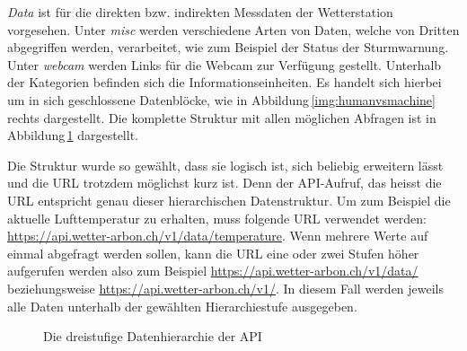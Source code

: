 \noindent
\emph{Data} ist für die direkten bzw. indirekten Messdaten der Wetterstation vorgesehen. Unter \emph{misc} werden verschiedene Arten von Daten, welche von Dritten abgegriffen werden, verarbeitet, wie zum Beispiel der Status der Sturmwarnung. Unter \emph{webcam} werden Links für die Webcam zur Verfügung gestellt. Unterhalb der Kategorien befinden sich die Informationseinheiten. Es handelt sich hierbei um in sich geschlossene Datenblöcke, wie in Abbildung\,\ref{img:humanvsmachine} rechts dargestellt. Die komplette Struktur mit allen möglichen Abfragen ist in Abbildung\,\ref{img:hierarchie} dargestellt.

Die Struktur wurde so gewählt, dass sie logisch ist, sich beliebig erweitern lässt und die URL trotzdem möglichst kurz ist. Denn der API-Aufruf, das heisst die URL entspricht genau dieser hierarchischen Datenstruktur. Um zum Beispiel die aktuelle Lufttemperatur zu erhalten, muss folgende URL verwendet werden: \url{https://api.wetter-arbon.ch/v1/data/temperature}. Wenn mehrere Werte auf einmal abgefragt werden sollen, kann die URL eine oder zwei Stufen höher aufgerufen werden also zum Beispiel \url{https://api.wetter-arbon.ch/v1/data/} beziehungsweise \url{https://api.wetter-arbon.ch/v1/}. In diesem Fall werden jeweils alle Daten unterhalb der gewählten Hierarchiestufe ausgegeben.


\begin{figure}[htbp!]
	\centering
	\caption{Die dreistufige Datenhierarchie der API}
	\label{img:hierarchie}
\end{figure}




